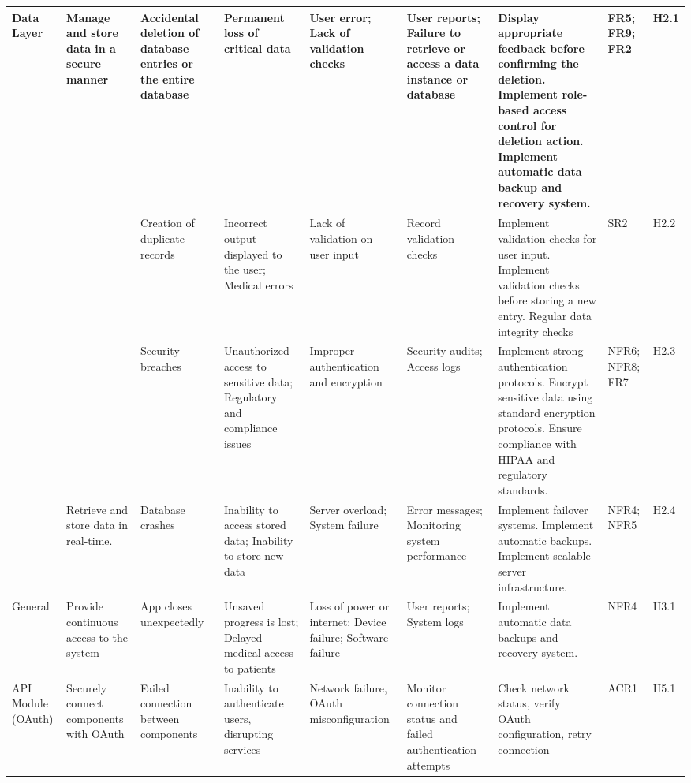 \documentclass{article}
\begin{document}
\begin{landscape}
\begin{longtable}{|p{1.5cm}|p{2cm}|p{2.6cm}|p{2cm}|p{2cm}|p{2cm}|p{3.5cm}|p{1cm}|p{0.8cm}|}
        \midrule
        Data Layer & \raggedright Manage and store data in a secure manner & \raggedright Accidental deletion of database entries or the entire database & \raggedright Permanent loss of critical data & \raggedright User error; Lack of validation checks & \raggedright User reports; Failure to retrieve or access a data instance or database & \raggedright Display appropriate feedback before confirming the deletion. Implement role-based access control for deletion action. Implement automatic data backup and recovery system. & FR5; FR9; FR2 & H2.1 \\ 
        \midrule
        & & \raggedright Creation of duplicate records & \raggedright Incorrect output displayed to the user; Medical errors & \raggedright Lack of validation on user input & \raggedright Record validation checks & \raggedright Implement validation checks for user input. Implement validation checks before storing a new entry. Regular data integrity checks & SR2 & H2.2 \\ 
        \midrule
        & & \raggedright Security breaches & \raggedright Unauthorized access to sensitive data; Regulatory and compliance issues & \raggedright Improper authentication and encryption & \raggedright Security audits; Access logs & \raggedright Implement strong authentication protocols. Encrypt sensitive data using standard encryption protocols. Ensure compliance with HIPAA and regulatory standards. & NFR6; NFR8; FR7 & H2.3 \\ 
        \midrule
        & \raggedright Retrieve and store data in real-time. & \raggedright Database crashes & \raggedright Inability to access stored data; Inability to store new data & \raggedright Server overload; System failure & \raggedright Error messages; Monitoring system performance & \raggedright Implement failover systems. Implement automatic backups. Implement scalable server infrastructure. & NFR4; NFR5 & H2.4 \\ 
        \midrule
        General & \raggedright Provide continuous access to the system & \raggedright App closes unexpectedly & \raggedright Unsaved progress is lost; Delayed medical access to patients & \raggedright Loss of power or internet; Device failure; Software failure & \raggedright User reports; System logs & \raggedright Implement automatic data backups and recovery system. & NFR4 & H3.1 \\
        \midrule
        API Module (OAuth) & \raggedright Securely connect components with OAuth & \raggedright Failed connection between components & \raggedright Inability to authenticate users, disrupting services & \raggedright Network failure, OAuth misconfiguration & \raggedright Monitor connection status and failed authentication attempts & \raggedright Check network status, verify OAuth configuration, retry connection & ACR1 & H5.1 \\

\end{longtable}
\end{landscape}
\end{document}
